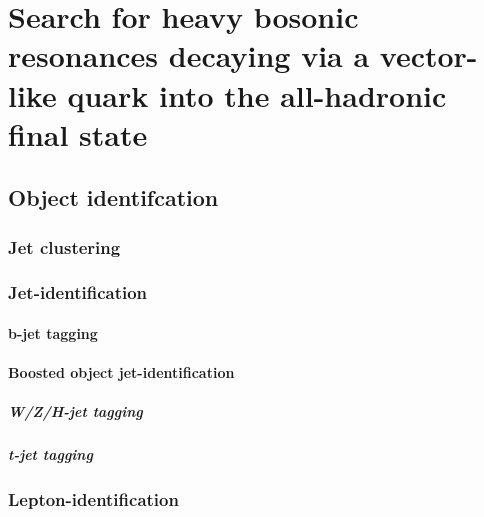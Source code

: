 \part{Search for heavy bosonic resonances decaying via a vector-like quark into the all-hadronic final state}

\chapter{Object identifcation}


\section{Jet clustering}

\section{Jet-identification}
\subsection{b-jet tagging}
\subsection{Boosted object jet-identification}
\subsubsection{W/Z/H-jet tagging}
\subsubsection{t-jet tagging}

\section{Lepton-identification}